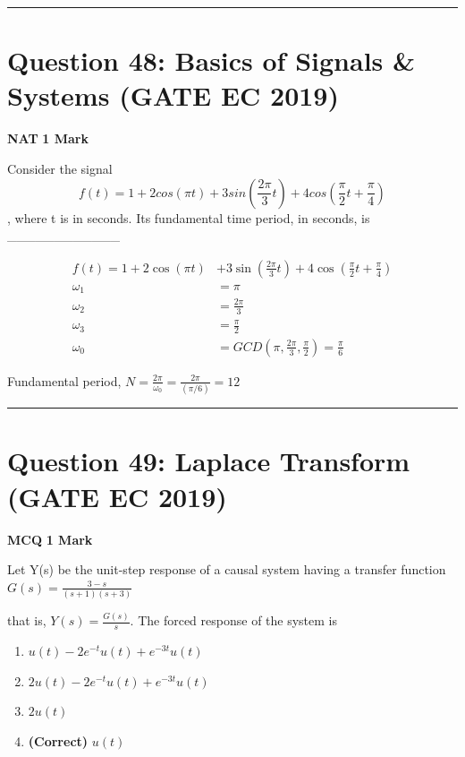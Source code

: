 \documentclass[11pt,a4paper]{article}
\begin{document}
\vspace{1.5em}
\hrule
\vspace{1.5em}

\section*{Question 48: Basics of Signals \& Systems (GATE EC 2019)}
\noindent \textbf{\color{primary}NAT} \hfill \textbf{\color{secondary}1 Mark}


\noindent Consider the signal 
\[
f(t)=1+2cos(\pi t)+3sin\left ( \frac{2 \pi}{3}t \right )+4cos\left (\frac{\pi}{2}t+\frac{\pi}{4} \right )
\]
, where t is in seconds. Its fundamental time period, in seconds, is \_\_\_\_\_\_\_\_\_\_\_\_


\begin{tcolorbox}[solbox, title=Detailed Solution -- Question 48]
\[
\begin{aligned} f(t)=1+2 \cos (\pi t)&+3 \sin \left(\frac{2 \pi}{3} t\right)+4 \cos \left(\frac{\pi}{2} t+\frac{\pi}{4}\right) \\ \omega_{1}&=\pi \\ \omega_{2}&=\frac{2 \pi}{3} \\ \omega_{3}&=\frac{\pi}{2} \\ \omega_{0}&=G C D\left(\pi, \frac{2 \pi}{3}, \frac{\pi}{2}\right)=\frac{\pi}{6} \end{aligned}
\]

 Fundamental period,
$N=\frac{2 \pi}{\omega_{0}}=\frac{2 \pi}{(\pi / 6)}=12$
\end{tcolorbox}

\vspace{1.5em}
\hrule
\vspace{1.5em}

\section*{Question 49: Laplace Transform (GATE EC 2019)}
\noindent \textbf{\color{primary}MCQ} \hfill \textbf{\color{secondary}1 Mark}


\noindent Let Y(s) be the unit-step response of a causal system having a transfer function
$G(s)=\frac{3-s}{(s+1)(s+3)}$

 that is, $Y(s)=\frac{G(s)}{s}$. The forced response of the system is


\begin{enumerate}[label=(\Alph*)]
    \item $u(t)-2e^{-t}u(t)+e^{-3t}u(t)$
    \item $2u(t)-2e^{-t}u(t)+e^{-3t}u(t)$
    \item $2u(t)$
    \item \textbf{(Correct)} $u(t)$
\end{enumerate}
\end{document}
